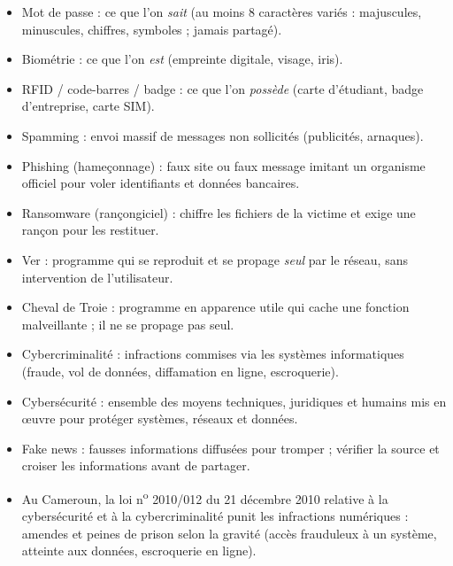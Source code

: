 \documentclass[11pt]{article}
\newcommand{\cle}[1]{{\popxbold\color{popdark}#1}}
\begin{document}
\begin{aretenir}
\begin{itemize}
  \item \cle{Mot de passe} : ce que l'on \emph{sait} (au moins 8 caractères variés : majuscules, minuscules, chiffres, symboles ; jamais partagé).
  \item \cle{Biométrie} : ce que l'on \emph{est} (empreinte digitale, visage, iris).
  \item \cle{RFID / code-barres / badge} : ce que l'on \emph{possède} (carte d'étudiant, badge d'entreprise, carte SIM).
\end{itemize}
\end{aretenir}

\begin{aretenir}
\begin{itemize}
  \item \cle{Spamming} : envoi massif de messages non sollicités (publicités, arnaques).
  \item \cle{Phishing} (hameçonnage) : faux site ou faux message imitant un organisme officiel pour voler identifiants et données bancaires.
  \item \cle{Ransomware} (rançongiciel) : chiffre les fichiers de la victime et exige une rançon pour les restituer.
  \item \cle{Ver} : programme qui se reproduit et se propage \emph{seul} par le réseau, sans intervention de l'utilisateur.
  \item \cle{Cheval de Troie} : programme en apparence utile qui cache une fonction malveillante ; il ne se propage pas seul.
\end{itemize}
\end{aretenir}

\begin{aretenir}
\begin{itemize}
  \item \cle{Cybercriminalité} : infractions commises via les systèmes informatiques (fraude, vol de données, diffamation en ligne, escroquerie).
  \item \cle{Cybersécurité} : ensemble des moyens techniques, juridiques et humains mis en œuvre pour protéger systèmes, réseaux et données.
  \item \cle{Fake news} : fausses informations diffusées pour tromper ; vérifier la source et croiser les informations avant de partager.
  \item Au Cameroun, la loi n\textsuperscript{o} 2010/012 du 21 décembre 2010 relative à la cybersécurité et à la cybercriminalité punit les infractions numériques : \cle{amendes} et peines de \cle{prison} selon la gravité (accès frauduleux à un système, atteinte aux données, escroquerie en ligne).
\end{itemize}
\end{aretenir}
\end{document}
